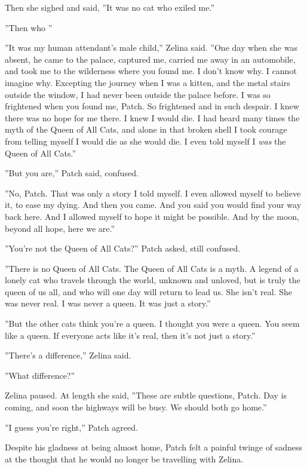 \documentclass[11pt]{article}
\begin{document}
Then she sighed and said, ''It was no cat who exiled me.''\par
 ''Then who %
''\par
 ''It was my human attendant's male child,'' Zelina said. ''One day when she was absent, he came to the palace, captured me, carried me away in an automobile, and took me to the wilderness where you found me. I don't know why. I cannot imagine why. Excepting the journey when I was a kitten, and the metal stairs outside the window, I had never been outside the palace before. I was so frightened when you found me, Patch. So frightened and in such despair. I knew there was no hope for me there. I knew I would die. I had heard many times the myth of the Queen of All Cats, and alone in that broken shell I took courage from telling myself I would die as she would die. I even told myself I {\it was} the Queen of All Cats.''\par
 ''But you are,'' Patch said, confused.\par
 ''No, Patch. That was only a story I told myself. I even allowed myself to believe it, to ease my dying. And then you came. And you said you would find your way back here. And I allowed myself to hope it might be possible. And by the moon, beyond all hope, here we are.''\par
 ''You're not the Queen of All Cats?'' Patch asked, still confused.\par
 ''There is no Queen of All Cats. The Queen of All Cats is a myth. A legend of a lonely cat who travels through the world, unknown and unloved, but is truly the queen of us all, and who will one day will return to lead us. She isn't real. She was never real. I was never a queen. It was just a story.''\par
 ''But the other cats think you're a queen. I thought you were a queen. You seem like a queen. If everyone acts like it's real, then it's not just a story.''\par
 ''There's a difference,'' Zelina said.\par
 ''What difference?''\par
 Zelina paused. At length she said, ''These are subtle questions, Patch. Day is coming, and soon the highways will be busy. We should both go home.''\par
 ''I guess you're right,'' Patch agreed.\par
 Despite his gladness at being almost home, Patch felt a painful twinge of sadness at the thought that he would no longer be travelling with Zelina.\par
\end{document}
